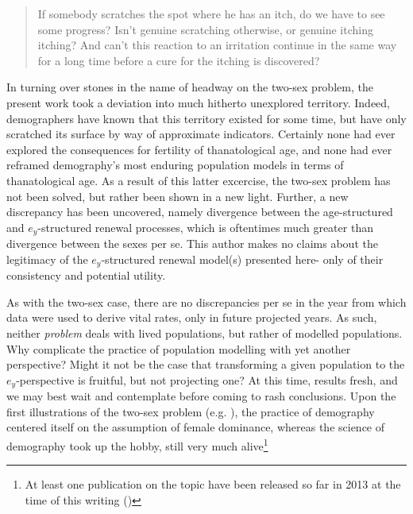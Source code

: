 
\begin{singlespace}
\begin{quote}
 If somebody scratches the spot where he has an itch, do we have to see 
 some progress? Isn't genuine scratching otherwise, or genuine itching 
itching? And can't this reaction to an irritation continue in the 
same way for a long time before a cure for the itching is discovered?
\citep{wittgenstein1984culture}
\end{quote}
\end{singlespace}

In turning over stones in the name of headway on the two-sex problem, the
present work took a deviation into much hitherto unexplored territory. Indeed,
demographers have known that this territory existed for some time, but have
only scratched its surface by way of approximate indicators. Certainly none had
ever explored the consequences for fertility of thanatological age, and none had
ever reframed demography's most enduring population models in terms of
thanatological age. As a result of this latter excercise, the two-sex problem
has not been solved, but rather been shown in a new light. Further, a new discrepancy 
has been uncovered, namely divergence between the age-structured and $e_y$-structured 
renewal processes, which is oftentimes much greater than divergence between 
the sexes per se. This author makes no claims about the legitimacy of 
the $e_y$-structured renewal model(s) presented here- only of their 
consistency and potential utility. 

As with the two-sex case, there are no
discrepancies per se in the year from which data were used to derive vital
rates, only in future projected years. As such, neither \textit{problem} deals with lived populations, but rather of
modelled populations. Why complicate the practice of population modelling with yet
another perspective? Might it not be the case that transforming a given
population to the $e_y$-perspective is fruitful, but not projecting one? At this
time, results fresh, and we may best wait and contemplate before coming to rash
conclusions. Upon the first illustrations of the two-sex problem (e.g.
\cite{kuczynski1932fertility}), the practice of demography centered itself on
the assumption of female dominance, whereas the science of demography took up
the hobby, still very much alive\footnote{At least one publication on the
topic have been released so far in 2013 at the time of this writing (\citet{Matthews2013})}



